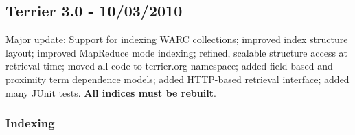 \subsection{Terrier 3.0 - 10/03/2010}\label{terrier-3.0---10032010}

Major update: Support for indexing WARC collections; improved index
structure layout; improved MapReduce mode indexing; refined, scalable
structure access at retrieval time; moved all code to terrier.org
namespace; added field-based and proximity term dependence models; added
HTTP-based retrieval interface; added many JUnit tests. \textbf{All
indices must be rebuilt}.

\subsubsection{Indexing}\label{indexing-4}

